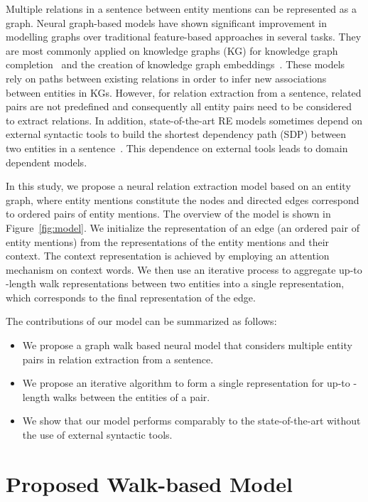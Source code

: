 \documentclass[11pt,a4paper]{article}
\begin{document}
	Multiple relations in a sentence between entity mentions can be represented as a graph.
    Neural graph-based models have shown significant improvement in modelling graphs 
    over traditional feature-based approaches in several tasks. 
    They are most commonly applied on knowledge graphs (KG) for knowledge graph completion~\cite{jiang2017attentive} and the creation of knowledge graph embeddings~\cite{wang2017knowledge,shi2017proje}. 
    These models rely on paths between existing relations in order to infer new associations between entities in KGs. 
	However, for relation extraction from a sentence, related pairs are not predefined and consequently all entity pairs need to be considered to extract relations. 
    In addition, state-of-the-art RE models sometimes depend on external syntactic tools to build the shortest dependency path (SDP) between two entities in a sentence~\cite{xu2015neg,miwa2016end}. 
    This dependence on external tools leads to domain dependent models. 
    
	In this study, we propose a neural relation extraction model based on an entity graph, where entity mentions constitute the nodes and directed edges correspond to ordered pairs of entity mentions.
    The overview of the model is shown in Figure~\ref{fig:model}. 
    We initialize the representation of an edge (an ordered pair of entity mentions) from the representations of the entity mentions and their context.
    The context representation is achieved by employing an attention mechanism on context words.
    We then use an iterative process to aggregate up-to -length walk representations between two entities into a single representation, which corresponds to the final representation of the edge.
    
    The contributions of our model can be summarized as follows:
	\begin{itemize}[nolistsep]
		\item We propose a graph walk based neural model that considers multiple entity pairs in relation extraction from a sentence.
		\item We propose an iterative algorithm to form a single representation for up-to -length walks between the entities of a pair.
		\item We show that our model performs comparably to the state-of-the-art without the use of external syntactic tools. 
	\end{itemize}
    
	
\section{Proposed Walk-based Model}
 
\end{document}

